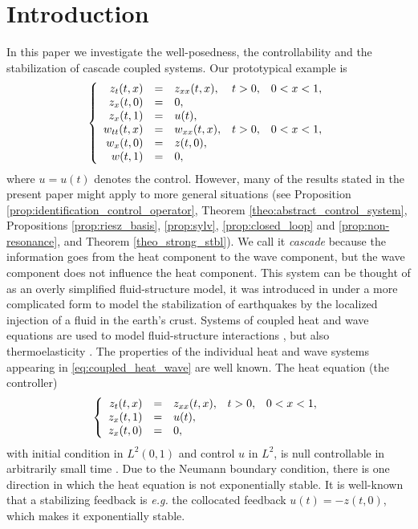 \documentclass[10pt]{article}
\begin{document}
\section{Introduction}
In this paper we investigate the well-posedness, the controllability and the stabilization of cascade coupled systems. Our prototypical example is
\begin{equation}\label{eq:coupled_heat_wave}
\left\lbrace \begin{array}{rcl cc}
z_t(t,x) &=& z_{xx}(t,x),&t>0,& 0 < x < 1, \\
z_x(t,0) &=&0, \\
z_x(t,1) &=& u(t),\\
w_{tt}(t,x) &=& w_{xx}(t,x),&t>0,& 0 < x < 1,\\
w_x(t,0) &=& z(t,0), \\
w(t,1) &=&0,
\end{array}\right.
\end{equation}
where $u = u(t)$ denotes the control. However, many of the results stated in the present paper might apply to more general situations (see Proposition \ref{prop:identification_control_operator}, Theorem \ref{theo:abstract_control_system}, Propositions \ref{prop:riesz_basis},  \ref{prop:sylv}, \ref{prop:closed_loop} and \ref{prop:non-resonance}, and  Theorem \ref{theo_strong_stbl}). We call it \textit{cascade} because the information goes from the heat component to the wave component, but the wave component does not influence the heat component. This system can be thought of as an overly simplified fluid-structure model, it was introduced in \cite{G22} under a more complicated form to model the stabilization of earthquakes by the localized injection of a fluid in the earth's crust. Systems of coupled heat and wave equations are used to model fluid-structure interactions \cite[Chapter 7, \S 7]{handbook}, but also thermoelasticity \cite[\S 1]{liu}. 
\newline
\newline
The properties of the individual heat and wave systems appearing in \eqref{eq:coupled_heat_wave} are well known. The heat equation (the controller)
\begin{equation}\label{eq:heat}
\left\lbrace \begin{array}{rcl cc}
z_{t}(t,x) &=& z_{xx}(t,x),&t>0,& 0 < x < 1,\\
z_x(t,1) &=& u(t),\\
z_x(t,0) &=&0,
\end{array} \right. 
\end{equation}
with initial condition in $L^2(0,1)$ and control $u$ in $L^2$, is null controllable in arbitrarily small time \cite{fattorini_russell}. Due to the Neumann boundary condition, there is one direction in which the heat equation is not exponentially stable. It is well-known that a stabilizing feedback is \textit{e.g.} the collocated feedback $u(t) = - z(t,0)$, which makes it exponentially stable. 
\end{document}
